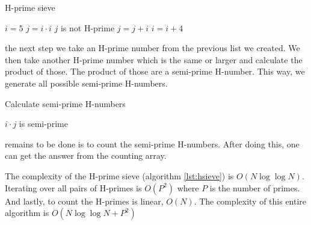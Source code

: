 \documentclass[11pt,a4paper,twoside]{article}
\begin{document}
\begin{algorithm}
    \caption{H-prime sieve}
    \label{lst:hsieve}
    \begin{algorithmic}
        \STATE $i = 5$
                \STATE $j = i \cdot i$
                    \STATE $j$ is not H-prime %
                    \STATE $j = j + i$
                \ENDWHILE
            \ENDIF
            \STATE $i = i + 4$
        \ENDWHILE
    \end{algorithmic}
\end{algorithm}

 the next step we take an H-prime number from the previous list we
created. We then take another H-prime number which is the same or larger and
calculate the product of those. The product of those are a semi-prime H-number.
This way, we generate all possible semi-prime H-numbers.

\begin{algorithm}
    \caption{Calculate semi-prime H-numbers}
    \label{Semi-prime H-numbers}
    \begin{algorithmic}
                \STATE $i \cdot j$ is semi-prime
            \ENDFOR
        \ENDFOR
    \end{algorithmic}
\end{algorithm}

 remains to be done is to count the semi-prime H-numbers. After
doing this, one can get the answer from the counting array.

The complexity of the H-prime sieve (algorithm \ref{lst:hsieve}) is
$O(N\log{\log{N}})$. Iterating over all pairs of H-primes is $O(P^2)$ where $P$ is the number of primes. And lastly, to
count the H-primes is linear, $O(N)$. The complexity of this entire algorithm
is $O(N\log{\log{N}} + P^2)$

\end{document}
